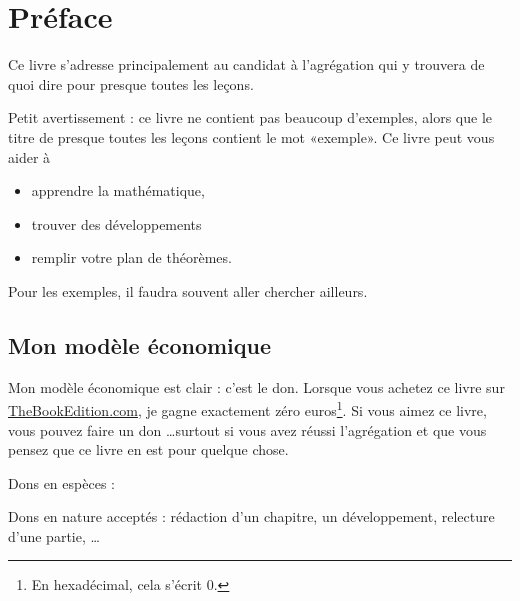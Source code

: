 
\section*{Préface}

Ce livre s'adresse principalement au candidat à l'agrégation qui y trouvera de quoi dire pour presque toutes les leçons.

Petit avertissement : ce livre ne contient pas beaucoup d'exemples, alors que le titre de presque toutes les leçons contient le mot «exemple». Ce livre peut vous aider à
\begin{itemize}
    \item apprendre la mathématique,
    \item trouver des développements
    \item remplir votre plan de théorèmes.
\end{itemize}
Pour les exemples, il faudra souvent aller chercher ailleurs.

\subsection*{Mon modèle économique}

Mon modèle économique est clair : c'est le don. Lorsque vous achetez ce livre sur \href{http://www.thebookedition.com/fr/}{TheBookEdition.com}, je gagne exactement zéro euros\footnote{En hexadécimal, cela s'écrit \( 0\).}. Si vous aimez ce livre, vous pouvez faire un don \ldots surtout si vous avez réussi l'agrégation et que vous pensez que ce livre en est pour quelque chose.


Dons en espèces :


Dons en nature acceptés : rédaction d'un chapitre, un développement, relecture d'une partie, \ldots
